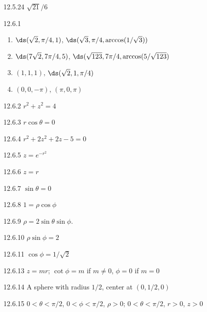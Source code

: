 \begin{Answer}{12.5.24}
	$\sqrt{21}/6$
\end{Answer}
\begin{Answer}{12.6.1}
\begin{enumerate}
	\item	$\ds (\sqrt2,\pi/4,1)$, $\ds (\sqrt3,\pi/4,\arccos(1/\sqrt3))$
	\item	$\ds (7\sqrt2,7\pi/4,5)$, $\ds (\sqrt{123},7\pi/4,\arccos(5/\sqrt{123})$
	\item	$(1,1,1)$, $\ds (\sqrt2,1,\pi/4)$
	\item	$(0,0,-\pi)$, $(\pi,0,\pi)$
\end{enumerate}
\end{Answer}
\begin{Answer}{12.6.2}
	$r^2+z^2=4$
\end{Answer}
\begin{Answer}{12.6.3}
	$r\cos\theta=0$
\end{Answer}
\begin{Answer}{12.6.4}
	$r^2+2z^2+2z-5=0$
\end{Answer}
\begin{Answer}{12.6.5}
	$z=e^{-r^2}$
\end{Answer}
\begin{Answer}{12.6.6}
	$z=r$
\end{Answer}
\begin{Answer}{12.6.7}
	$\sin\theta=0$
\end{Answer}
\begin{Answer}{12.6.8}
	$1=\rho\cos\phi$
\end{Answer}
\begin{Answer}{12.6.9}
	$\rho=2\sin\theta\sin\phi$.
\end{Answer}
\begin{Answer}{12.6.10}
	$\rho\sin\phi=2$
\end{Answer}
\begin{Answer}{12.6.11}
	$\cos\phi=1/\sqrt2$
\end{Answer}
\begin{Answer}{12.6.13}
	$z=mr$; $\cot\phi=m$ if $m\neq0$, $\phi=0$ if $m=0$
\end{Answer}
\begin{Answer}{12.6.14}
	A sphere with radius $1/2$, center at $(0,1/2,0)$
\end{Answer}
\begin{Answer}{12.6.15}
	$0<\theta<\pi/2$, $0<\phi<\pi/2$, $\rho>0$;
$0<\theta<\pi/2$, $r>0$, $z>0$
\end{Answer}
